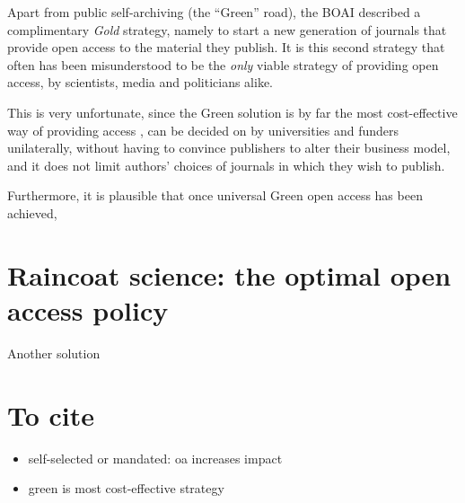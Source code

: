 \documentclass[11pt, openany, oneside, article, a4paper, twocolumn]{memoir}
\begin{document}
Apart from public self-archiving (the \enquote{Green} road), the BOAI
described a complimentary \emph{Gold} strategy, namely to start a new
generation of journals that provide open access to the material they
publish. It is this second strategy that often has been misunderstood to
be the \emph{only} viable strategy of providing open access, by
scientists, media and politicians alike.

This is very unfortunate, since the Green solution is by far the most
cost-effective way of providing access \cite{houghton2013planting}, can be
decided on by universities and funders unilaterally, without having to
convince publishers to alter their business model, and it does not limit
authors' choices of journals in which they wish to publish.

Furthermore, it is plausible that once universal Green open access has
been achieved, 

\section{Raincoat science: the optimal open access policy}

Another solution










\section{To cite}
\begin{itemize}
  \item self-selected or mandated: oa increases impact \cite{gargouri2010self}
  \item green is most cost-effective strategy \cite{houghton2013planting}
\end{itemize}

\twocolumn[
   \begin{@twocolumnfalse}
     \printbibliography
   \end{@twocolumnfalse}
]
\end{document}
